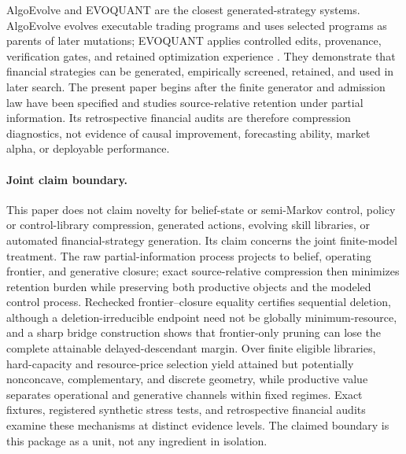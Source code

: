 AlgoEvolve and EVOQUANT are the closest generated-strategy systems.
AlgoEvolve evolves executable trading programs and uses selected programs as
parents of later mutations; EVOQUANT applies controlled edits, provenance,
verification gates, and retained optimization experience
\cite{SharmaShroff2026AlgoEvolve,MaoEtAl2026EvoQuant}.  They demonstrate that
financial strategies can be generated, empirically screened, retained, and
used in later search.  The present paper begins after the finite generator and
admission law have been specified and studies source-relative retention under
partial information.  Its retrospective financial audits are therefore
compression diagnostics, not evidence of causal improvement, forecasting
ability, market alpha, or deployable performance.

\paragraph{Joint claim boundary.}
This paper does not claim novelty for belief-state or semi-Markov control,
policy or control-library compression, generated actions, evolving skill
libraries, or automated financial-strategy generation.  Its claim concerns
the joint finite-model treatment.  The raw partial-information process
projects to belief, operating frontier, and generative closure; exact
source-relative compression then minimizes retention burden while preserving
both productive objects and the modeled control process.  Rechecked
frontier--closure equality certifies sequential deletion, although a
deletion-irreducible endpoint need not be globally minimum-resource, and a
sharp bridge construction shows that frontier-only pruning can lose the
complete attainable delayed-descendant margin.  Over finite eligible
libraries, hard-capacity and resource-price selection yield attained but
potentially nonconcave, complementary, and discrete geometry, while productive
value separates operational and generative channels within fixed regimes.
Exact fixtures, registered synthetic stress tests, and retrospective financial
audits examine these mechanisms at distinct evidence levels.  The claimed
boundary is this package as a unit, not any ingredient in isolation.
